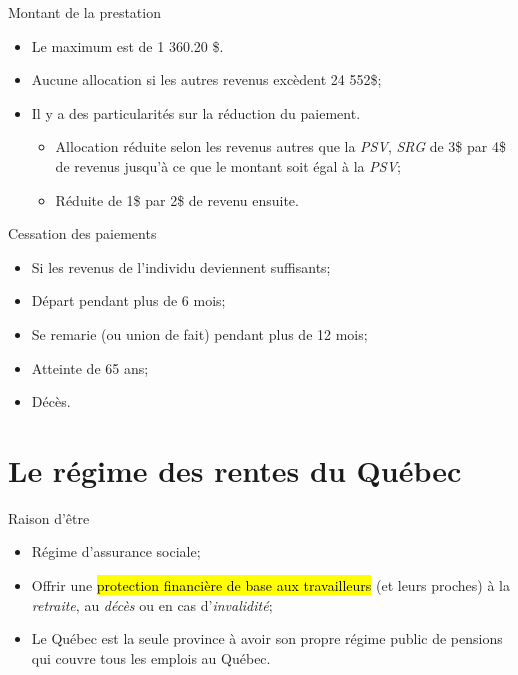 \documentclass[10pt, french]{article}
\begin{document}
\begin{multicols*}{3}
\begin{conceptgen}{Montant de la prestation}
\begin{itemize}[leftmargin = *]
	\item	Le maximum est de 1 360.20 \$.
	\item	Aucune allocation si les autres revenus excèdent 24 552\$;
	\item	Il y a des particularités sur la réduction du paiement.
		\begin{itemize}[leftmargin = *]
		\item   Allocation réduite selon les revenus autres que la \textit{PSV}, \textit{SRG} de 3\$ par 4\$ de revenus jusqu'à ce que le montant soit égal à la \textit{PSV};
		\item   Réduite de 1\$ par 2\$ de revenu ensuite. 
		\end{itemize}
\end{itemize}
\end{conceptgen}

\begin{conceptgen}{Cessation des paiements}
\begin{itemize}[leftmargin = *]
	\item	Si les revenus de l'individu deviennent suffisants;
	\item 	Départ pendant plus de 6 mois;
	\item	Se remarie (ou union de fait) pendant plus de 12 mois;
	\item 	Atteinte de 65 ans;
	\item	Décès.
\end{itemize}
\end{conceptgen}



\newpage

\section{Le régime des rentes du Québec}

\begin{conceptgen}{Raison d'être}
\begin{itemize}[leftmargin = *]
	\item	Régime d'assurance sociale;
	\item	Offrir une \hl{protection financière de base aux travailleurs} (et leurs proches) à la \textit{retraite}, au \textit{décès} ou en cas d'\textit{invalidité};
	\item	Le \textcolor{blue(pigment)}{Québec} est la seule province à avoir son propre régime public de pensions qui couvre tous les emplois au \textcolor{blue(pigment)}{Québec}.
\end{itemize}


\end{conceptgen}
\end{multicols*}
\end{document}
